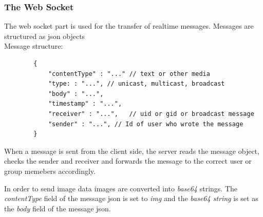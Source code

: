 \documentclass[titlepage]{article}
\begin{document}
    \subsubsection{The Web Socket}
    The web socket part is used for the transfer of realtime messages.
    Messages are structured as json objects\\
    Message structure:
    \begin{verbatim}
        {
            "contentType" : "..." // text or other media
            "type: : "...", // unicast, multicast, broadcast
            "body" : "...",
            "timestamp" : "...",
            "receiver" : "...",   // uid or gid or broadcast message
            "sender" : "...", // Id of user who wrote the message
        }
    \end{verbatim}

    When a message is sent from the client side, the server reads the message object, checks the sender and receiver and
    forwards the message to the correct user or group memebers accordingly.


    In order to send image data images are converted into \emph{base64} strings.
    The \textit{contentType} field of the message json is set to \emph{img} and
    the \emph{base64 string} is set as the \textit{body} field of the message json.
\end{document}
